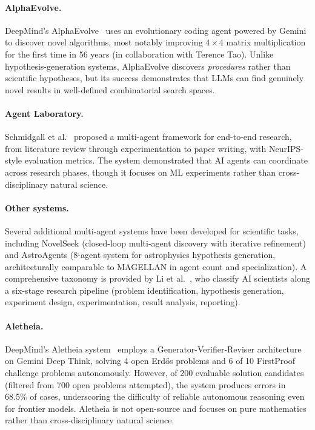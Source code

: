 \paragraph{AlphaEvolve.} DeepMind's AlphaEvolve~\citep{deepmind2025alphaevolve} uses an evolutionary coding agent powered by Gemini to discover novel algorithms, most notably improving $4 \times 4$ matrix multiplication for the first time in 56 years (in collaboration with Terence Tao). Unlike hypothesis-generation systems, AlphaEvolve discovers \emph{procedures} rather than scientific hypotheses, but its success demonstrates that LLMs can find genuinely novel results in well-defined combinatorial search spaces.

\paragraph{Agent Laboratory.} Schmidgall et al.~\citep{schmidgall2025} proposed a multi-agent framework for end-to-end research, from literature review through experimentation to paper writing, with NeurIPS-style evaluation metrics. The system demonstrated that AI agents can coordinate across research phases, though it focuses on ML experiments rather than cross-disciplinary natural science.

\paragraph{Other systems.} Several additional multi-agent systems have been developed for scientific tasks, including NovelSeek (closed-loop multi-agent discovery with iterative refinement) and AstroAgents (8-agent system for astrophysics hypothesis generation, architecturally comparable to MAGELLAN in agent count and specialization). A comprehensive taxonomy is provided by Li et al.~\citep{li2025survey}, who classify AI scientists along a six-stage research pipeline (problem identification, hypothesis generation, experiment design, experimentation, result analysis, reporting).

\paragraph{Aletheia.} DeepMind's Aletheia system~\citep{deepmind2025aletheia} employs a Generator-Verifier-Reviser architecture on Gemini Deep Think, solving 4 open Erd\H{o}s problems and 6 of 10 FirstProof challenge problems autonomously. However, of 200 evaluable solution candidates (filtered from 700 open problems attempted), the system produces errors in 68.5\% of cases, underscoring the difficulty of reliable autonomous reasoning even for frontier models. Aletheia is not open-source and focuses on pure mathematics rather than cross-disciplinary natural science.

